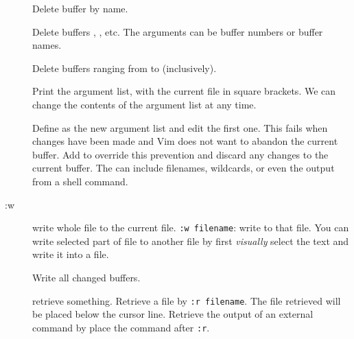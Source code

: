 \begin{description}
  \item[] Delete buffer by name.
  \item[] Delete buffers , , etc. The arguments can be buffer numbers or buffer names.
  \item[] Delete buffers ranging from  to  (inclusively).
  \item[] 
  \item[] Print the argument list, with the current file in square brackets. We can change the contents of the argument list at any time.
  \item[] Define  as the new argument list and edit the first one. This fails when changes have been made and Vim does not want to abandon the current buffer. Add \syntax{!} to override this prevention and discard any changes to the current buffer. The  can include filenames, wildcards, or even the output from a shell command.
  \item[] 
  \item[] 
  \item[] 
  \item[] 
  \item[] 
  \item[] 
  \item[] 
  \item[] 
  \item[] 
  \item[] 
  \item[] 
  \item[] 
  \item[:w] write whole file to the current file. \texttt{:w filename}: write to that file. You can write selected part of file to another file by first \emph{visually} select the text and write it into a file.
  \item[] Write all changed buffers.
  \item[] retrieve something. Retrieve a file by \texttt{:r filename}. The file retrieved will be placed below the cursor line. Retrieve the output of an external command by place the command after \texttt{:r}.

\end{description}
